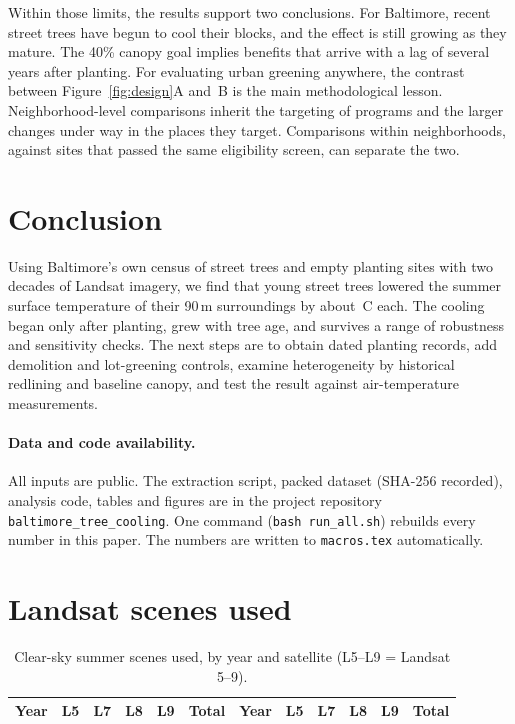 \documentclass[11pt]{article}
\newcommand{\degC}{\,\textdegree C}
\begin{document}
Within those limits, the results support two conclusions. For Baltimore, recent street trees have begun to cool their blocks, and the effect is still growing as they mature. The 40\% canopy goal implies benefits that arrive with a lag of several years after planting. For evaluating urban greening anywhere, the contrast between Figure~\ref{fig:design}A and~B is the main methodological lesson. Neighborhood-level comparisons inherit the targeting of programs and the larger changes under way in the places they target. Comparisons within neighborhoods, against sites that passed the same eligibility screen, can separate the two.

\section{Conclusion}

Using Baltimore's own census of street trees and empty planting sites with two decades of Landsat imagery, we find that young street trees lowered the summer surface temperature of their 90\,m surroundings by about \EstAabs\degC{} each. The cooling began only after planting, grew with tree age, and survives a range of robustness and sensitivity checks. The next steps are to obtain dated planting records, add demolition and lot-greening controls, examine heterogeneity by historical redlining and baseline canopy, and test the result against air-temperature measurements.

\paragraph{Data and code availability.} All inputs are public. The extraction script, packed dataset (SHA-256 recorded), analysis code, tables and figures are in the project repository \texttt{baltimore\_tree\_cooling}. One command (\texttt{bash run\_all.sh}) rebuilds every number in this paper. The numbers are written to \texttt{macros.tex} automatically.




\appendix
\section{Landsat scenes used}

\begin{table}[ht]\centering\small
\caption{Clear-sky summer scenes used, by year and satellite (L5--L9 = Landsat 5--9).}\label{tab:scenes}
\begin{tabular}{@{}lccccc|lccccc@{}}\toprule
Year & L5 & L7 & L8 & L9 & Total & Year & L5 & L7 & L8 & L9 & Total \\\midrule

\bottomrule\end{tabular}
\end{table}
\end{document}
